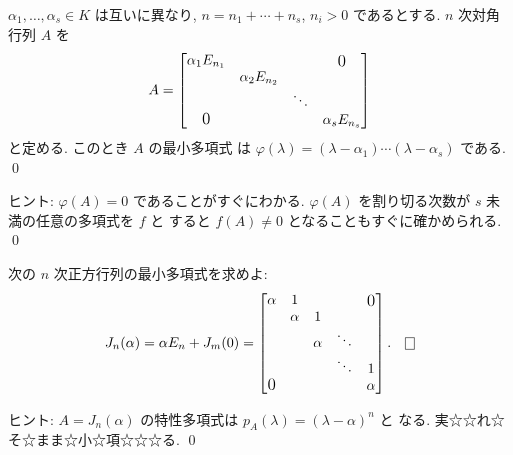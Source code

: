 \documentclass[12pt,twoside]{jarticle}
\begin{document}

\begin{question}
\label{q:minimal-polyn-5}
  $\alpha_1,\dots,\alpha_s\in K$ は互いに異なり, 
  $n=n_1+\cdots+n_s$, $n_i>0$ であるとする.  $n$ 次対角行列 $A$ を
  \begin{equation*}
    A =
    \begin{bmatrix}
      \alpha_1 E_{n_1} &                  &        & \bigzerou \\
                       & \alpha_2 E_{n_2} &        & \\
                       &                  & \ddots & \\
      \bigzerol        &                  &        & \alpha_s E_{n_s} \\
    \end{bmatrix}
  \end{equation*}
  と定める.  このとき $A$ の最小多項式
  は $\varphi(\lambda)=(\lambda-\alpha_1)\cdots(\lambda-\alpha_s)$ である.
  \qed
\end{question}

\noindent
ヒント: $\varphi(A)=0$ であることがすぐにわかる.  
$\varphi(A)$ を割り切る次数が $s$ 未満の任意の多項式を $f$ と
すると $f(A)\ne 0$ となることもすぐに確かめられる.
\qed


\begin{question}
\label{q:minimal-polyn-6}
  次の $n$ 次正方行列の最小多項式を求めよ:
  \begin{equation*}
    J_n(\alpha) = \alpha E_n + J_m(0) =
    \begin{bmatrix}
      \alpha &    1   &        &        & \bigzerou \\
             & \alpha &    1   &        & \\
             &        & \alpha & \ddots & \\
             &        &        & \ddots & 1 \\
      \bigzerol &     &        &        & \alpha \\
    \end{bmatrix}.
    \qed
  \end{equation*}
\end{question}

\noindent
ヒント: $A=J_n(\alpha)$ の特性多項式は $p_A(\lambda)=(\lambda-\alpha)^n$ と
なる.  実☆☆れ☆そ☆まま☆小☆項☆☆☆る.
\qed

\end{document}
